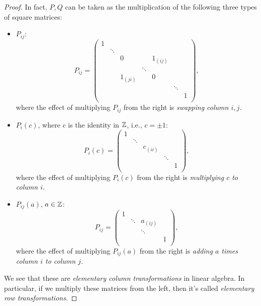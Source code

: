 \begin{proof}
	In fact, \(P, Q\) can be taken as the multiplication of the following three types of square matrices:
	\begin{itemize}
		\item \(P_{ij} \):
		      \[
			      P_{ij} = \begin{pmatrix}
				      1 &        &           &        &           &        &   \\
				        & \ddots &           &        &           &        &   \\
				        &        & 0         &        & 1_{(i j)} &        &   \\
				        &        &           & \ddots &           &        &   \\
				        &        & 1_{(j i)} &        & 0         &        &   \\
				        &        &           &        &           & \ddots &   \\
				        &        &           &        &           &        & 1 \\
			      \end{pmatrix},
		      \]
		      where the effect of multiplying \(P_{ij} \) from the right is \emph{swapping column \(i, j\)}.
		\item \(P_{i}(c) \), where \(c\) is the identity in \(\mathbb{\MakeUppercase{z}} \), i.e., \(c = \pm 1\):
		      \[
			      P_{i}(c) = \begin{pmatrix}
				      1 &        &          &        &   \\
				        & \ddots &          &        &   \\
				        &        & c_{(ii)} &        &   \\
				        &        &          & \ddots &   \\
				        &        &          &        & 1 \\
			      \end{pmatrix},
		      \]
		      where the effect of multiplying \(P_{i}(c)\) from the right is \emph{multiplying \(c\) to column \(i\)}.
		\item \(P_{ij}(a) \), \(a\in \mathbb{\MakeUppercase{z}} \):
		      \[
			      P_{ij} = \begin{pmatrix}
				      1 &        &           &   \\
				        & \ddots & a_{(i j)} &   \\
				        &        & \ddots    &   \\
				        &        &           & 1 \\
			      \end{pmatrix},
		      \]
		      where the effect of multiplying \(P_{ij}(a) \) from the right is \emph{adding \(a\) times column \(i\) to column \(j\)}.
	\end{itemize}
	We see that these are \emph{elementary column transformations} in linear algebra. In particular, if we multiply these matrices from the left, then it's called \emph{elementary row transformations}.


\end{proof}
